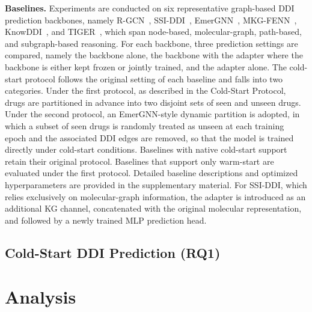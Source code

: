 \documentclass[letterpaper]{article} %
\begin{document}
\textbf{Baselines.} Experiments are conducted on six representative graph-based DDI prediction backbones, namely R-GCN~\cite{rgcn}, SSI-DDI~\cite{ssiddi}, EmerGNN~\cite{emergnn}, MKG-FENN~\cite{mkgfenn}, KnowDDI~\cite{knowddi}, and TIGER~\cite{tiger}, which span node-based, molecular-graph, path-based, and subgraph-based reasoning. For each backbone, three prediction settings are compared, namely the backbone alone, the backbone with the adapter where the backbone is either kept frozen or jointly trained, and the adapter alone. The cold-start protocol follows the original setting of each baseline and falls into two categories. Under the first protocol, as described in the Cold-Start Protocol, drugs are partitioned in advance into two disjoint sets of seen and unseen drugs. Under the second protocol, an EmerGNN-style dynamic partition is adopted, in which a subset of seen drugs is randomly treated as unseen at each training epoch and the associated DDI edges are removed, so that the model is trained directly under cold-start conditions. Baselines with native cold-start support retain their original protocol. Baselines that support only warm-start are evaluated under the first protocol. Detailed baseline descriptions and optimized hyperparameters are provided in the supplementary material. For SSI-DDI, which relies exclusively on molecular-graph information, the adapter is introduced as an additional KG channel, concatenated with the original molecular representation, and followed by a newly trained MLP prediction head.

\subsection{Cold-Start DDI Prediction (RQ1)}

\section{Analysis}
\end{document}
